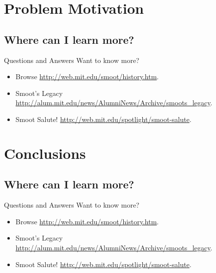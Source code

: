 \documentclass{beamer}
\begin{document}
\section{Problem Motivation}
\subsection{Where can I learn more?}
\begin{frame}{Questions and Answers}
  Want to know more?

  \begin{itemize}
    \item Browse \url{http://web.mit.edu/smoot/history.htm}.
    \item Smoot's Legacy \url{http://alum.mit.edu/news/AlumniNews/Archive/smoots_legacy}.
    \item Smoot Salute! \url{http://web.mit.edu/spotlight/smoot-salute}.
  \end{itemize}
\end{frame}

\section{Conclusions}
\subsection{Where can I learn more?}
\begin{frame}{Questions and Answers}
  Want to know more?

  \begin{itemize}
    \item Browse \url{http://web.mit.edu/smoot/history.htm}.
    \item Smoot's Legacy \url{http://alum.mit.edu/news/AlumniNews/Archive/smoots_legacy}.
    \item Smoot Salute! \url{http://web.mit.edu/spotlight/smoot-salute}.
  \end{itemize}
  
\end{frame}
\end{document}
